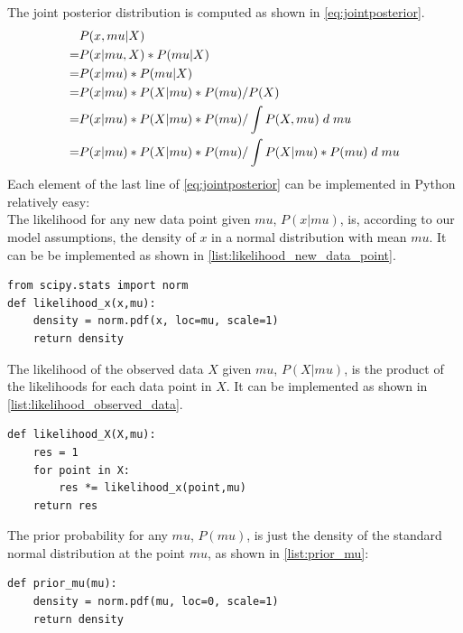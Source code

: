 \documentclass{article}
\begin{document}
The joint posterior distribution is computed as shown in \autoref{eq:jointposterior}.
\begin{equation}
\label{eq:jointposterior}
\begin{split}
&P(x,mu|X) \\
= &P(x|mu,X) * P(mu|X) \\
= &P(x|mu) * P(mu|X) \\
= &P(x|mu) * P(X|mu) * P(mu) / P(X) \\
= &P(x|mu) * P(X|mu) * P(mu) / \int P(X,mu) \hspace{1mm} d \hspace{1mm} mu \\
= &P(x|mu) * P(X|mu) * P(mu) / \int P(X|mu) * P(mu) \hspace{1mm} d \hspace{1mm} mu
\end{split}
\end{equation}
Each element of the last line of \autoref{eq:jointposterior} can be implemented in Python relatively easy: 
\\
The likelihood for any new data point given $mu$, $P(x|mu)$, is, according to our model assumptions, the density of $x$ in a normal distribution with mean $mu$. It can be be implemented as shown in \autoref{list:likelihood_new_data_point}.
\begin{lstlisting}[caption={Implementation of the likelihood for one data point}, label={list:likelihood_new_data_point},captionpos=b]
from scipy.stats import norm
def likelihood_x(x,mu):
    density = norm.pdf(x, loc=mu, scale=1)
    return density
\end{lstlisting}
The likelihood of the observed data $X$ given $mu$, $P(X|mu)$, is the product of the likelihoods for each data point in $X$. It can be implemented as shown in \autoref{list:likelihood_observed_data}.
\begin{lstlisting}[caption={Implementation of the likelihood for the observed data}, label={list:likelihood_observed_data},captionpos=b]
def likelihood_X(X,mu):
    res = 1
    for point in X:
        res *= likelihood_x(point,mu)
    return res
\end{lstlisting}
The prior probability for any $mu$, $P(mu)$, is just the density of the standard normal distribution at the point $mu$, as shown in \autoref{list:prior_mu}:
\begin{lstlisting}[caption={Implementation of the prior for mu}, label={list:prior_mu},captionpos=b]
def prior_mu(mu):
    density = norm.pdf(mu, loc=0, scale=1)
    return density
\end{lstlisting}
\end{document}
